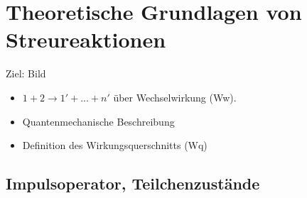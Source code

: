 \chapter{Theoretische Grundlagen von Streureaktionen}

Ziel: Bild \\
\begin{itemize}
\item $1+2 \to 1' + ... + n'$ über Wechselwirkung (Ww). 
\item Quantenmechanische Beschreibung 
\item Definition des Wirkungsquerschnitts (Wq)
\end{itemize}

\section{Impulsoperator, Teilchenzustände}

